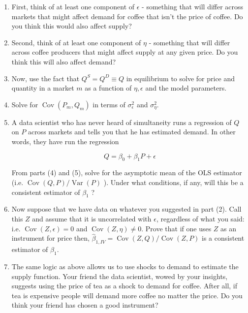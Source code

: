 \documentclass[11pt]{article}
\begin{document}
\begin{enumerate}[label=\alph*.]
	\item First, think of at least one component of $\epsilon$ - something that will differ across markets that might affect demand for coffee that isn't the price of coffee. Do you think this would also affect supply?
	\item Second, think of at least one component of $\eta$ - something that will differ across coffee producers that might affect supply at any given price. Do you think this will also affect demand?
	\item Now, use the fact that $Q^S=Q^D \equiv Q$ in equilibrium to solve for price and quantity in a market $m$ as a function of $\eta, \epsilon$ and the model parameters.

	\item Solve for $\operatorname{Cov}\left(P_m, Q_m\right)$ in terms of $\sigma_\epsilon^2$ and $\sigma_\eta^2$.

	\item A data scientist who has never heard of simultaneity runs a regression of $Q$ on $P$ across markets and tells you that he has estimated demand. In other words, they have run the regression

	$$
	Q=\beta_0+\beta_1 P+\epsilon
	$$

	From parts (4) and (5), solve for the asymptotic mean of the OLS estimator (i.e. $\operatorname{Cov}(Q, P) / \operatorname{Var}(P)$ ). Under what conditions, if any, will this be a consistent estimator of $\beta_1$ ?

	\item Now suppose that we have data on whatever you suggested in part (2). Call this $Z$ and assume that it is uncorrelated with $\epsilon$, regardless of what you said: i.e. $\operatorname{Cov}(Z, \epsilon)=0$ and $\operatorname{Cov}(Z, \eta) \neq 0$. Prove that if one uses $Z$ as an instrument for price then, $\hat{\beta}_{1, I V}= \operatorname{Cov}(Z, Q) / \operatorname{Cov}(Z, P)$ is a consistent estimator of $\beta_1$.

	\item The same logic as above allows us to use shocks to demand to estimate the supply function. Your friend the data scientist, wowed by your insights, suggests using the price of tea as a shock to demand for coffee. After all, if tea is expensive people will demand more coffee no matter the price. Do you think your friend has chosen a good instrument?
\end{enumerate}
\end{document}

